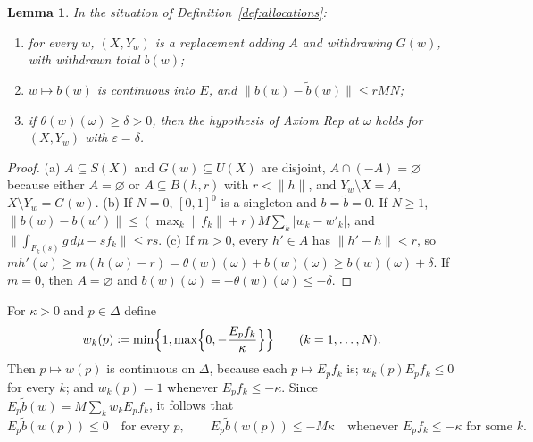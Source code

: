 \documentclass[11pt]{article}
\newenvironment{chgblockb}{\color{violet}}{}
\newtheorem{lemma}[theorem]{Lemma}
\theoremstyle{definition}
\theoremstyle{remark}
\begin{document}
\begin{lemma}\label{lem:allocations}
In the situation of Definition~\ref{def:allocations}:
\begin{enumerate}[label=(\alph*)]
\item for every $w$, $(X,Y_w)$ is a replacement adding $A$ and withdrawing $G(w)$, with withdrawn total $b(w)$;
\item $w\mapsto b(w)$ is continuous into $E$, and $\|b(w)-\tilde b(w)\|\le rMN$;
\item if $\theta(w)(\omega)\ge\delta>0$, then the hypothesis of Axiom Rep at $\omega$ holds for $(X,Y_w)$ with $\varepsilon=\delta$.
\end{enumerate}
\end{lemma}
\begin{proof}
(a) $A\subseteq S(X)$ and $G(w)\subseteq U(X)$ are disjoint, $A\cap(-A)=\varnothing$ because either $A=\varnothing$ or $A\subseteq B(h,r)$ with $r<\|h\|$, and $Y_w\setminus X=A$, $X\setminus Y_w=G(w)$. (b) If $N=0$, $[0,1]^0$ is a singleton and $b=\tilde b=0$. If $N\ge1$, $\|b(w)-b(w')\|\le(\max_k\|f_k\|+r)M\sum_k|w_k-w'_k|$, and $\|\int_{F_k(s)}g\,d\mu-sf_k\|\le rs$. (c) If $m>0$, every $h'\in A$ has $\|h'-h\|<r$, so $mh'(\omega)\ge m(h(\omega)-r)=\theta(w)(\omega)+b(w)(\omega)\ge b(w)(\omega)+\delta$. If $m=0$, then $A=\varnothing$ and $b(w)(\omega)=-\theta(w)(\omega)\le-\delta$.
\end{proof}

\begin{chgblockb}
For $\kappa>0$ and $p\in\Delta$ define
\[
w_k(p)\coloneqq\min\Bigl\{1,\max\Bigl\{0,-\frac{E_pf_k}{\kappa}\Bigr\}\Bigr\}\qquad(k=1,\dots,N).
\]
Then $p\mapsto w(p)$ is continuous on $\Delta$, because each $p\mapsto E_pf_k$ is; $w_k(p)E_pf_k\le0$ for every $k$; and $w_k(p)=1$ whenever $E_pf_k\le-\kappa$. Since $E_p\tilde b(w)=M\sum_kw_kE_pf_k$, it follows that
\begin{equation}\label{eq:withdrawal-bounds}
E_p\tilde b(w(p))\le0\quad\text{for every }p,\qquad E_p\tilde b(w(p))\le-M\kappa\quad\text{whenever }E_pf_k\le-\kappa\text{ for some }k.
\end{equation}
\end{chgblockb}
\end{document}
